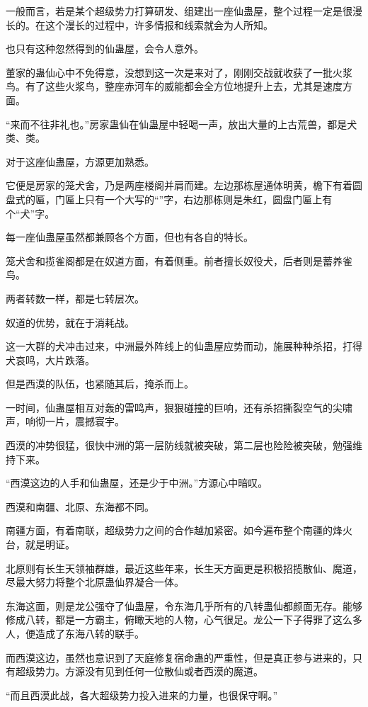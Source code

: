 \begin{this_body}
一般而言，若是某个超级势力打算研发、组建出一座仙蛊屋，整个过程一定是很漫长的。在这个漫长的过程中，许多情报和线索就会为人所知。

也只有这种忽然得到的仙蛊屋，会令人意外。

董家的蛊仙心中不免得意，没想到这一次是来对了，刚刚交战就收获了一批火浆鸟。有了这些火浆鸟，整座赤河车的威能都会全方位地提升上去，尤其是速度方面。

“来而不往非礼也。”房家蛊仙在仙蛊屋中轻喝一声，放出大量的上古荒兽，都是犬类、类。

对于这座仙蛊屋，方源更加熟悉。

它便是房家的笼犬舍，乃是两座楼阁并肩而建。左边那栋屋通体明黄，檐下有着圆盘式的匾，门匾上只有一个大写的“”字，右边那栋则是朱红，圆盘门匾上有个“犬”字。

每一座仙蛊屋虽然都兼顾各个方面，但也有各自的特长。

笼犬舍和揽雀阁都是在奴道方面，有着侧重。前者擅长奴役犬，后者则是蓄养雀鸟。

两者转数一样，都是七转层次。

奴道的优势，就在于消耗战。

这一大群的犬冲击过来，中洲最外阵线上的仙蛊屋应势而动，施展种种杀招，打得犬哀鸣，大片跌落。

但是西漠的队伍，也紧随其后，掩杀而上。

一时间，仙蛊屋相互对轰的雷鸣声，狠狠碰撞的巨响，还有杀招撕裂空气的尖啸声，响彻一片，震撼寰宇。

西漠的冲势很猛，很快中洲的第一层防线就被突破，第二层也险险被突破，勉强维持下来。

“西漠这边的人手和仙蛊屋，还是少于中洲。”方源心中暗叹。

西漠和南疆、北原、东海都不同。

南疆方面，有着南联，超级势力之间的合作越加紧密。如今遍布整个南疆的烽火台，就是明证。

北原则有长生天领袖群雄，最近这些年来，长生天方面更是积极招揽散仙、魔道，尽最大努力将整个北原蛊仙界凝合一体。

东海这面，则是龙公强夺了仙蛊屋，令东海几乎所有的八转蛊仙都颜面无存。能够修成八转，都是一方霸主，俯瞰天地的人物，心气很足。龙公一下子得罪了这么多人，便造成了东海八转的联手。

而西漠这边，虽然也意识到了天庭修复宿命蛊的严重性，但是真正参与进来的，只有超级势力。方源没有见到任何一位散仙或者西漠的魔道。

“而且西漠此战，各大超级势力投入进来的力量，也很保守啊。”


\end{this_body}
